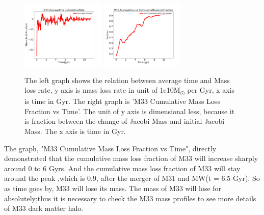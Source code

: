 \documentclass[twocolumn]{aastex63}
\begin{document}
\begin{figure}[H]
    \centering
    \includegraphics[width=4cm]{M33MassLossRate.png}\hfill
    \includegraphics[width=4cm]{CumulativeMasslossfractionvsTime.png}\hfill
    \caption{The left graph shows the relation between average time and Mass loss rate, y axis is mass loss rate in unit of 1e10M\textsubscript{\(\odot\)} per Gyr, x axis is time in Gyr. The right graph is 'M33 Cumulative Mass Loss Fraction vs Time'. The unit of y axis is dimensional less, because it is fraction between the change of Jacobi Mass and initial Jacobi Mass. The x axis is time in Gyr. }
\end{figure}
The graph, "M33 Cumulative Mass Loss Fraction vs Time", directly demonstrated that the cumulative mass loss fraction of M33 will increase sharply around 0 to 6 Gyrs. And the cumulative mass loss fraction of M33 will stay around the peak ,which is 0.9, after the merger of M31 and MW(t = 6.5 Gyr).  So as time goes by, M33 will lose its mass. The mass of M33 will lose for absolutely;thus it is necessary to check the M33 mass profiles to see more details of M33 dark matter halo. \\
\end{document}
